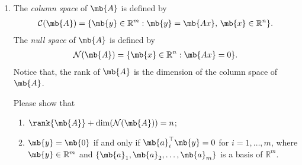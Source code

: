 \begin{exercise}
\begin{enumerate}
		\item The \emph{column space} of $\mb{A}$ is defined by
			\begin{align*}
				\mathcal{C}(\mb{A} ) = \{ \mb{y}\in \mathbb{R}^m : \mb{y} = \mb{Ax},\,\mb{x}\in\mathbb{R}^n\}.
			\end{align*}
			The \emph{null space} of $\mb{A}$ is defined by
			\begin{align*}
				\mathcal{N}(\mb{A})  = \{ \mb{x}\in \mathbb{R}^n : \mb{Ax}=0\}.
			\end{align*}
			Notice that, the rank of $\mb{A}$ is the dimension of the column space of $\mb{A}$.

			Please show that
			\begin{enumerate}
				\item $\rank{\mb{A}} + \dim ( \mathcal{N}( \mb{A} ) ) = n$;
				\item $\mb{y}=\mb{0}$ if and only if $\mb{a}_i^{\top}\mb{y}=0$ for $i=1,\ldots,m$, where $\mb{y}\in \mathbb{R}^m$ and  $\{\mb{a}_1,\mb{a}_2,\ldots,\mb{a}_m\}$ is a basis of $\mathbb{R}^m$.
			\end{enumerate}


\end{enumerate}
\end{exercise}
